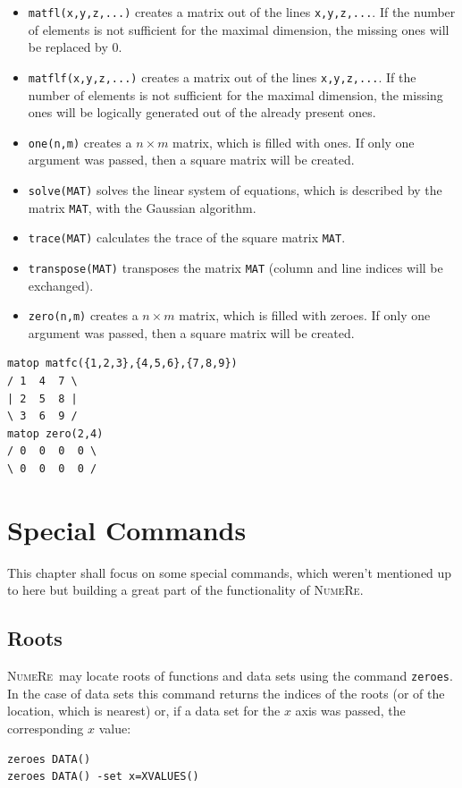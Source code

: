 \documentclass[DIV=14,headsepline,footsepline]{scrbook}
\newcommand{\NR}{\textsc{Nu\-me\-Re}}
\begin{document}
\begin{itemize}
					\item \lstinline+matfl(x,y,z,...)+ creates a matrix out of the lines \lstinline+x,y,z,...+. If the number of elements is not sufficient for the maximal dimension, the missing ones will be replaced by 0.
					\item \lstinline+matflf(x,y,z,...)+ creates a matrix out of the lines \lstinline+x,y,z,...+. If the number of elements is not sufficient for the maximal dimension, the missing ones will be logically generated out of the already present ones.
					\item \lstinline+one(n,m)+ creates a $n \times m$ matrix, which is filled with ones. If only one argument was passed, then a square matrix will be created.
					\item \lstinline+solve(MAT)+ solves the linear system of equations, which is described by the matrix \lstinline+MAT+, with the Gaussian algorithm.
					\item \lstinline+trace(MAT)+ calculates the trace of the square matrix \lstinline+MAT+.
					\item \lstinline+transpose(MAT)+ transposes the matrix \lstinline+MAT+ (column and line indices will be exchanged).
					\item \lstinline+zero(n,m)+ creates a $n \times m$ matrix, which is filled with zeroes. If only one argument was passed, then a square matrix will be created.
				\end{itemize}
				\begin{lstlisting}
matop matfc({1,2,3},{4,5,6},{7,8,9})
/ 1  4  7 \
| 2  5  8 |
\ 3  6  9 /
matop zero(2,4)
/ 0  0  0  0 \
\ 0  0  0  0 /
				\end{lstlisting}
		\chapter{Special Commands}
			This chapter shall focus on some special commands, which weren't mentioned up to here but building a great part of the functionality of \NR.
			\section{Roots}
				\NR\ may locate roots of functions and data sets using the command \lstinline+zeroes+\cmd{zeroes}. In the case of data sets this command returns the indices of the roots (or of the location, which is nearest) or, if a data set for the $x$ axis was passed, the corresponding $x$ value:
				\begin{lstlisting}
zeroes DATA()
zeroes DATA() -set x=XVALUES()
				\end{lstlisting}
				
\end{document}
